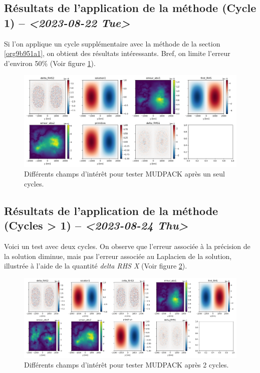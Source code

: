 \documentclass[10pt]{article}
\numberwithin{equation}{section}
\begin{document}
\subsection{Résultats de l'application de la méthode (Cycle 1) -- \textit{<2023-08-22 Tue>}}
\label{sec:org9fd790b}
Si l'on applique un cycle supplémentaire avec la méthode de la section \ref{org9b951a1}, on obtient des résultats intéressants.
Bref, on limite l'erreur d'environ 50\% (Voir figure \ref{fig:org371b15d}).

\begin{figure}[htbp]
\centering
\includegraphics[width=.9\linewidth]{figures/MUDPACK/2023-08-23_MUDPACK_test_dirichlet2.png}
\caption{\label{fig:org371b15d}Différents champs d'intérêt pour tester MUDPACK après un seul cycles.}
\end{figure}
\subsection{Résultats de l'application de la méthode (Cycles > 1) -- \textit{<2023-08-24 Thu>}}
\label{sec:org77a3c84}
Voici un test avec deux cycles.
On observe que l'erreur associée à la précision de la solution diminue, mais pas l'erreur associée au Laplacien de la solution, illustrée à l'aide de la quantité \emph{delta RHS X} (Voir figure \ref{fig:org21129f7}).

\begin{figure}[htbp]
\centering
\includegraphics[width=.9\linewidth]{figures/MUDPACK/2023-08-23_MUDPACK_test_dirichlet3.png}
\caption{\label{fig:org21129f7}Différents champs d'intérêt pour tester MUDPACK après 2 cycles.}
\end{figure}
\end{document}
